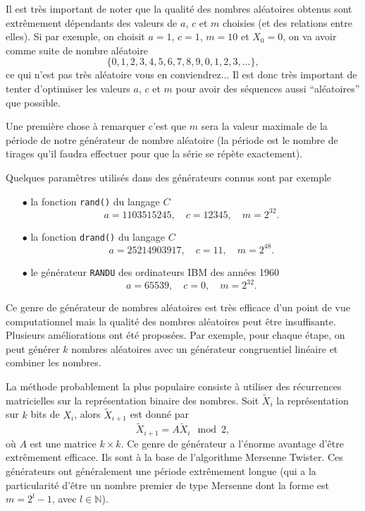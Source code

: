 \documentclass[a4paper,12pt]{book}
\renewcommand{\natural}{\mathbb{N}}
\begin{document}
Il est très important de noter que la qualité des nombres aléatoires obtenus
sont extrêmement dépendants des valeurs de $a$, $c$ et $m$ choisies (et des 
relations entre elles). Si par exemple, on choisit 
$a=1$, $c=1$, $m=10$ et $X_0=0$, on va avoir comme suite de nombre aléatoire
\begin{equation}
 \{0,1,2,3,4,5,6,7,8,9,0,1,2,3,...\},
\end{equation}
ce qui n'est pas très aléatoire vous en conviendrez... Il est donc très important
de tenter d'optimiser les valeurs $a$, $c$ et $m$ pour
avoir des séquences aussi ``aléatoires'' que possible.

Une première chose à remarquer c'est que $m$ sera la valeur maximale de la période
de notre générateur de nombre aléatoire (la période est le nombre de tirages qu'il faudra
effectuer pour que la série se répète exactement).

Quelques paramètres utilisés dans des générateurs connus sont par exemple
\begin{itemize}
 \item[$\bullet$] la fonction \texttt{rand()} du langage $C$ 
 \begin{equation*}
  a=1103515245,\quad c=12345,\quad m=2^{32}.
 \end{equation*}
 \item[$\bullet$] la fonction \texttt{drand()} du langage $C$ 
 \begin{equation*}
  a=25214903917,\quad c=11,\quad m=2^{48}.
 \end{equation*}
 \item[$\bullet$] le générateur \texttt{RANDU} des ordinateurs IBM des années 1960
 \begin{equation*}
  a=65539,\quad c=0,\quad m=2^{32}.
 \end{equation*}
\end{itemize}

Ce genre de générateur de nombres aléatoires est très efficace d'un point de vue computationnel
mais la qualité des nombres aléatoires peut être insuffisante. Plusieurs améliorations
ont été proposées. Par exemple, pour chaque étape, on peut générer $k$ nombres aléatoires
avec un générateur congruentiel linéaire et combiner les nombres.

La méthode probablement la plus populaire consiste à utiliser 
des récurrences matricielles sur la représentation binaire des nombres.
Soit $\tilde X_i$ la représentation sur $k$ bits de $X_i$, alors 
$\tilde X_{i+1}$ est donné par
\begin{equation}
 \tilde X_{i+1}=A \tilde X_i \mod 2,
\end{equation}
où $A$ est une matrice $k\times k$. Ce genre de générateur a l'énorme
avantage d'être extrêmement efficace. Ils sont à la base de l'algorithme Mersenne Twister.
Ces générateurs ont généralement une période extrêmement longue (qui a la particularité d'être
un nombre premier de type Mersenne dont la forme est $m=2^l-1$, avec $l\in\natural$).
\end{document}
